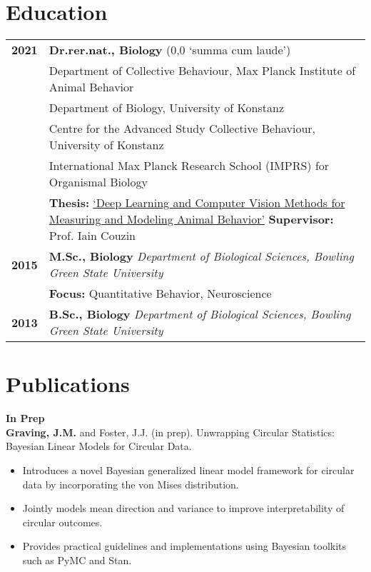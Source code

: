 \documentclass[10pt,letterpaper]{article}
\begin{document}
\section*{Education}
\begin{tabular}{@{}p{1.5cm}p{15cm}@{}}
	\textbf{2021} & \textbf{Dr.rer.nat., Biology} (0,0 `summa cum laude')\\[4pt]
	& Department of Collective Behaviour, Max Planck Institute of Animal Behavior\\
	& Department of Biology, University of Konstanz\\
	& Centre for the Advanced Study Collective Behaviour, University of Konstanz\\
	& International Max Planck Research School (IMPRS) for Organismal Biology\\[2pt]
	& \textbf{Thesis:} \href{http://nbn-resolving.de/urn:nbn:de:bsz:352-2-dgcbudqch6ix8}{`Deep Learning and Computer Vision Methods for Measuring and Modeling Animal Behavior'} \quad \textbf{Supervisor:} Prof. Iain Couzin\\[8pt]
	\textbf{2015} & \textbf{M.Sc., Biology} \quad \textit{Department of Biological Sciences, Bowling Green State University}\\[2pt]
	& \textbf{Focus:} Quantitative Behavior, Neuroscience\\[8pt]
	\textbf{2013} & \textbf{B.Sc., Biology} \quad \textit{Department of Biological Sciences, Bowling Green State University}
\end{tabular}



	
	\section*{Publications}
	\textbf{In Prep}\\
	\textbf{Graving, J.M.} and Foster, J.J. (in prep). Unwrapping Circular Statistics: Bayesian Linear Models for Circular Data.
	\begin{itemize}
		\item Introduces a novel Bayesian generalized linear model framework for circular data by incorporating the von Mises distribution.
		\item Jointly models mean direction and variance to improve interpretability of circular outcomes.
		\item Provides practical guidelines and implementations using Bayesian toolkits such as PyMC and Stan.
	\end{itemize}
	
\end{document}
